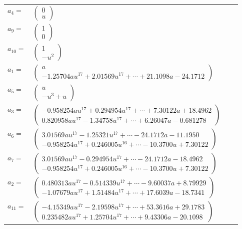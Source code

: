 \documentclass[1p]{elsarticle_modified}
\theoremstyle{definition}
\begin{document}
\begin{tabular}{m{7pt} m{180pt} m{7pt} m{180pt} }
\flushright $a_{4}=$&$\begin{pmatrix}0\\u\end{pmatrix}$ \\
\flushright $a_{9}=$&$\begin{pmatrix}1\\0\end{pmatrix}$ \\
\flushright $a_{10}=$&$\begin{pmatrix}1\\- u^2\end{pmatrix}$ \\
\flushright $a_{1}=$&$\begin{pmatrix}a\\-1.25704 a u^{17}+2.01569 u^{17}+\cdots+21.1098 a-24.1712\end{pmatrix}$ \\
\flushright $a_{5}=$&$\begin{pmatrix}u\\- u^3+u\end{pmatrix}$ \\
\flushright $a_{3}=$&$\begin{pmatrix}-0.958254 a u^{17}+0.294954 u^{17}+\cdots+7.30122 a+18.4962\\0.820958 a u^{17}-1.34758 u^{17}+\cdots+6.26047 a-0.681278\end{pmatrix}$ \\
\flushright $a_{6}=$&$\begin{pmatrix}3.01569 a u^{17}-1.25321 u^{17}+\cdots-24.1712 a-11.1950\\-0.958254 u^{17}+0.246005 u^{16}+\cdots-10.3700 u+7.30122\end{pmatrix}$ \\
\flushright $a_{7}=$&$\begin{pmatrix}3.01569 a u^{17}-0.294954 u^{17}+\cdots-24.1712 a-18.4962\\-0.958254 u^{17}+0.246005 u^{16}+\cdots-10.3700 u+7.30122\end{pmatrix}$ \\
\flushright $a_{2}=$&$\begin{pmatrix}0.480313 a u^{17}-0.514339 u^{17}+\cdots-9.60037 a+8.79929\\-1.07679 a u^{17}+1.51484 u^{17}+\cdots+17.6039 a-18.7341\end{pmatrix}$ \\
\flushright $a_{11}=$&$\begin{pmatrix}-4.15349 a u^{17}-2.19598 u^{17}+\cdots+53.3616 a+29.1783\\0.235482 a u^{17}+1.25704 u^{17}+\cdots+9.43306 a-20.1098\end{pmatrix}$ \\

\end{tabular}
\end{document}
